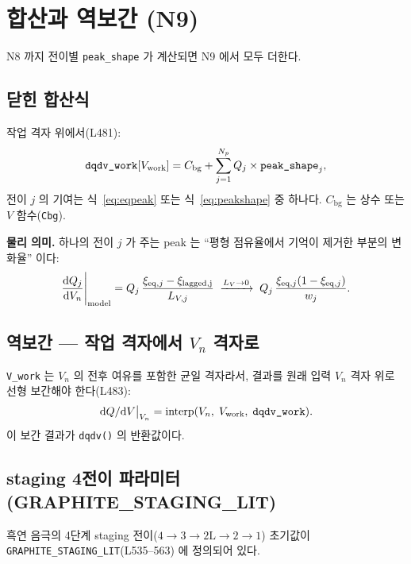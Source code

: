 \documentclass[11pt,a4paper]{article}
\newcommand{\dd}{\mathrm{d}}
\newcommand{\eq}{\mathrm{eq}}
\newcommand{\bg}{\mathrm{bg}}
\begin{document}
\section{합산과 역보간 (N9)}\label{sec:total}

N8 까지 전이별 \texttt{peak\_shape} 가 계산되면 N9 에서 모두 더한다.

\subsection{닫힌 합산식}

작업 격자 위에서(L481):
\begin{equation}
\texttt{dqdv\_work}[V_{\rm work}]
= C_\bg + \sum_{j=1}^{N_p} Q_j \times \texttt{peak\_shape}_j,
\label{eq:sum}
\end{equation}
전이 $j$ 의 기여는 식~\eqref{eq:eqpeak} 또는 식~\eqref{eq:peakshape} 중 하나다.
$C_\bg$ 는 상수 또는 $V$ 함수(\texttt{Cbg}).

\textbf{물리 의미.} 하나의 전이 $j$ 가 주는 peak 는 ``평형 점유율에서 기억이
제거한 부분의 변화율'' 이다:
\begin{equation}
\frac{\dd Q_j}{\dd V_n}\Bigg|_{\rm model}
= Q_j\,\frac{\xi_{\eq,j} - \xi_{\rm lagged,j}}{L_{V,j}}
\;\xrightarrow{L_{V}\to0}\;
Q_j\,\frac{\xi_{\eq,j}(1-\xi_{\eq,j})}{w_j}.
\label{eq:peakfull}
\end{equation}

\subsection{역보간 — 작업 격자에서 $V_n$ 격자로}

\texttt{V\_work} 는 $V_n$ 의 전후 여유를 포함한 균일 격자라서, 결과를 원래 입력
$V_n$ 격자 위로 선형 보간해야 한다(L483):
\begin{equation}
\dd Q/\dd V\big|_{V_n} = \mathrm{interp}(V_n,\; V_{\rm work},\; \texttt{dqdv\_work}).
\label{eq:interp}
\end{equation}
이 보간 결과가 \texttt{dqdv()} 의 반환값이다.

\subsection{staging 4전이 파라미터 (GRAPHITE\_STAGING\_LIT)}

흑연 음극의 4단계 staging 전이($4\to3\to2\mathrm{L}\to2\to1$) 초기값이
\texttt{GRAPHITE\_STAGING\_LIT}(L535--563) 에 정의되어 있다.
\end{document}
